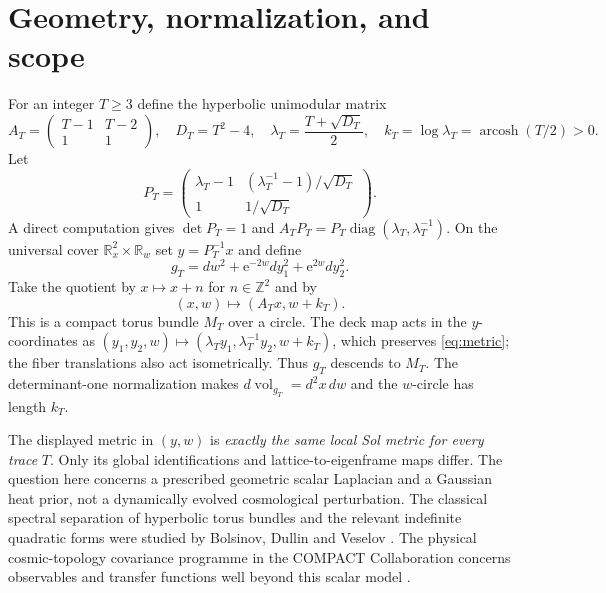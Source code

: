 \documentclass[11pt,a4paper]{article}
\newcommand{\Z}{\mathbb Z}
\newcommand{\R}{\mathbb R}
\newcommand{\e}{\mathrm e}
\begin{document}
\section{Geometry, normalization, and scope}
For an integer $T\ge3$ define the hyperbolic unimodular matrix
\begin{equation}\label{eq:AT}
 A_T=\begin{pmatrix}T-1&T-2\\1&1\end{pmatrix},
 \quad D_T=T^2-4,\quad
 \lambda_T=\frac{T+\sqrt{D_T}}2,\quad
 k_T=\log\lambda_T=\operatorname{arcosh}(T/2)>0.
\end{equation}
Let
\[
P_T=
\begin{pmatrix}
\lambda_T-1&(\lambda_T^{-1}-1)/\sqrt{D_T}\\
1&1/\sqrt{D_T}
\end{pmatrix}.
\]
A direct computation gives $\det P_T=1$ and
$A_TP_T=P_T\operatorname{diag}(\lambda_T,\lambda_T^{-1})$.
On the universal cover $\R^2_x\times\R_w$ set $y=P_T^{-1}x$ and define
\begin{equation}\label{eq:metric}
g_T=dw^2+\e^{-2w}dy_1^2+\e^{2w}dy_2^2 .
\end{equation}
Take the quotient by $x\mapsto x+n$ for $n\in\Z^2$ and by
\[
(x,w)\mapsto(A_Tx,w+k_T).
\]
This is a compact torus bundle $M_T$ over a circle. The deck map acts
in the $y$-coordinates as
$(y_1,y_2,w)\mapsto(\lambda_Ty_1,\lambda_T^{-1}y_2,w+k_T)$,
which preserves \eqref{eq:metric}; the fiber translations also act
isometrically. Thus $g_T$ descends to $M_T$.
The determinant-one normalization makes $d\operatorname{vol}_{g_T}=d^2x\,dw$
and the $w$-circle has length $k_T$.

The displayed metric in $(y,w)$ is \emph{exactly the same local Sol
metric for every trace} $T$. Only its global identifications and
lattice-to-eigenframe maps differ. The question here concerns a
prescribed geometric scalar Laplacian and a Gaussian heat prior, not
a dynamically evolved cosmological perturbation. The classical
spectral separation of hyperbolic torus bundles and the relevant
indefinite quadratic forms were studied by Bolsinov, Dullin and
Veselov \cite{bdv}. The physical cosmic-topology covariance
programme in the COMPACT Collaboration concerns observables and
transfer functions well beyond this scalar model \cite{compact,overview}.
\end{document}
